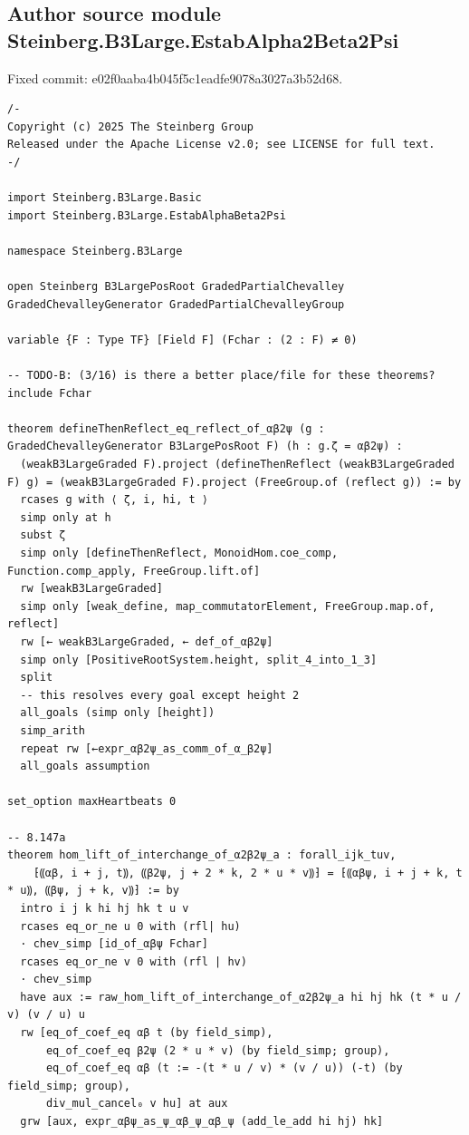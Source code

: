\subsection*{Author source module Steinberg.B3Large.EstabAlpha2Beta2Psi}
\noindent Fixed commit: e02f0aaba4b045f5c1eadfe9078a3027a3b52d68.
\begin{Verbatim}
/-
Copyright (c) 2025 The Steinberg Group
Released under the Apache License v2.0; see LICENSE for full text.
-/

import Steinberg.B3Large.Basic
import Steinberg.B3Large.EstabAlphaBeta2Psi

namespace Steinberg.B3Large

open Steinberg B3LargePosRoot GradedPartialChevalley GradedChevalleyGenerator GradedPartialChevalleyGroup

variable {F : Type TF} [Field F] (Fchar : (2 : F) ≠ 0)

-- TODO-B: (3/16) is there a better place/file for these theorems?
include Fchar

theorem defineThenReflect_eq_reflect_of_αβ2ψ (g : GradedChevalleyGenerator B3LargePosRoot F) (h : g.ζ = αβ2ψ) :
  (weakB3LargeGraded F).project (defineThenReflect (weakB3LargeGraded F) g) = (weakB3LargeGraded F).project (FreeGroup.of (reflect g)) := by
  rcases g with ⟨ ζ, i, hi, t ⟩
  simp only at h
  subst ζ
  simp only [defineThenReflect, MonoidHom.coe_comp, Function.comp_apply, FreeGroup.lift.of]
  rw [weakB3LargeGraded]
  simp only [weak_define, map_commutatorElement, FreeGroup.map.of, reflect]
  rw [← weakB3LargeGraded, ← def_of_αβ2ψ]
  simp only [PositiveRootSystem.height, split_4_into_1_3]
  split
  -- this resolves every goal except height 2
  all_goals (simp only [height])
  simp_arith
  repeat rw [←expr_αβ2ψ_as_comm_of_α_β2ψ]
  all_goals assumption

set_option maxHeartbeats 0

-- 8.147a
theorem hom_lift_of_interchange_of_α2β2ψ_a : forall_ijk_tuv,
    ⁅⸨αβ, i + j, t⸩, ⸨β2ψ, j + 2 * k, 2 * u * v⸩⁆ = ⁅⸨αβψ, i + j + k, t * u⸩, ⸨βψ, j + k, v⸩⁆ := by
  intro i j k hi hj hk t u v
  rcases eq_or_ne u 0 with (rfl| hu)
  · chev_simp [id_of_αβψ Fchar]
  rcases eq_or_ne v 0 with (rfl | hv)
  · chev_simp
  have aux := raw_hom_lift_of_interchange_of_α2β2ψ_a hi hj hk (t * u / v) (v / u) u
  rw [eq_of_coef_eq αβ t (by field_simp),
      eq_of_coef_eq β2ψ (2 * u * v) (by field_simp; group),
      eq_of_coef_eq αβ (t := -(t * u / v) * (v / u)) (-t) (by field_simp; group),
      div_mul_cancel₀ v hu] at aux
  grw [aux, expr_αβψ_as_ψ_αβ_ψ_αβ_ψ (add_le_add hi hj) hk]


\end{Verbatim}
